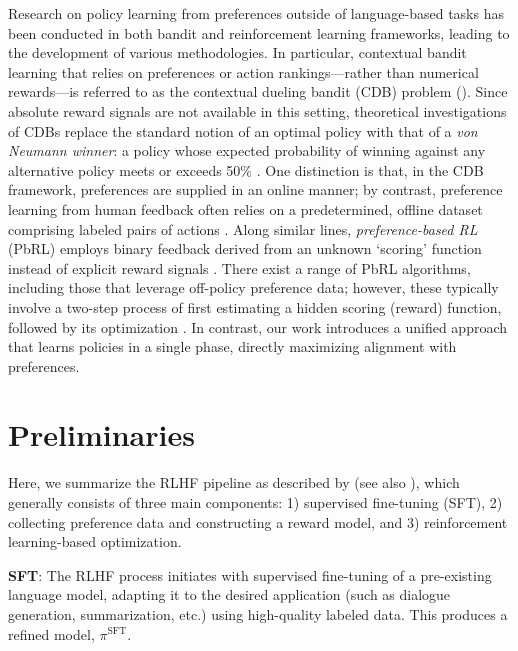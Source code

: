 Research on policy learning from preferences outside of language-based tasks has been conducted in both bandit and reinforcement learning frameworks, leading to the development of various methodologies. In particular, contextual bandit learning that relies on preferences or action rankings—rather than numerical rewards—is referred to as the contextual dueling bandit (CDB) problem (\cite{yue2012karmed,dudik2015contextual}). Since absolute reward signals are not available in this setting, theoretical investigations of CDBs replace the standard notion of an optimal policy with that of a \textit{von Neumann winner}: a policy whose expected probability of winning against any alternative policy meets or exceeds 50\% \citep{dudik2015contextual}. One distinction is that, in the CDB framework, preferences are supplied in an online manner; by contrast, preference learning from human feedback often relies on a predetermined, offline dataset comprising labeled pairs of actions \citep{yan2022human}. Along similar lines, \textit{preference-based RL} (PbRL) employs binary feedback derived from an unknown ‘scoring’ function instead of explicit reward signals \citep{BusaFekete2014,ruiz2023dueling}. There exist a range of PbRL algorithms, including those that leverage off-policy preference data; however, these typically involve a two-step process of first estimating a hidden scoring (reward) function, followed by its optimization \citep{jain2013learning,BusaFekete2014,christiano2017deep,sadigh2017active,kupcsik2018learning}. In contrast, our work introduces a unified approach that learns policies in a single phase, directly maximizing alignment with preferences.

\section{Preliminaries}\label{section:prelims}

Here, we summarize the RLHF pipeline as described by \citeauthor{ziegler2020finetuning} (see also \citep{stiennon2022learning, bai2022training, ouyang2022training}), which generally consists of three main components: 1) supervised fine-tuning (SFT), 2) collecting preference data and constructing a reward model, and 3) reinforcement learning-based optimization.

\textbf{SFT}: The RLHF process initiates with supervised fine-tuning of a pre-existing language model, adapting it to the desired application (such as dialogue generation, summarization, etc.) using high-quality labeled data. This produces a refined model, $\pi^\text{SFT}$.

